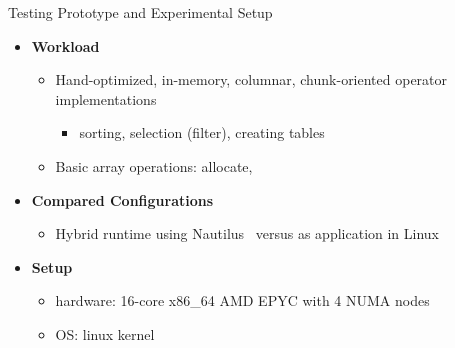 \begin{block}{Testing Prototype and Experimental Setup}
  \begin{itemize}
    \item \textbf{Workload}
      \begin{itemize}
      \item Hand-optimized, in-memory, columnar, chunk-oriented operator
        implementations
    \begin{itemize}
    \item sorting, selection (filter), creating tables
    \end{itemize}
  \item Basic array operations: allocate, 
  \end{itemize}
   \item \textbf{Compared Configurations}
    \begin{itemize}
    \item Hybrid runtime using Nautilus~\cite{HALE:2015:NAUTILUS} versus as application in Linux 
    \end{itemize}
  \item \textbf{Setup}
    \begin{itemize}
    \item hardware: 16-core x86\_64 AMD EPYC with 4 NUMA nodes
    \item OS: linux kernel 
    \end{itemize}
  \end{itemize}
\end{block}
